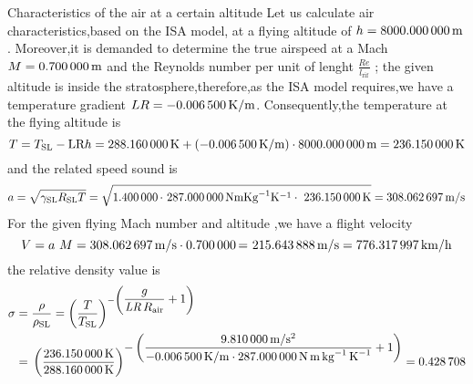 \documentclass[[12pt,twoside]{book}
\begin{document}
%

%
\begin{myExampleX}{Characteristics of the air at a certain altitude}{}%
\label{example:Characteristics:Of:The:Air:At:A:Certain:Altitude}
%
\noindent
Let us calculate air characteristics,based on the ISA model, at a flying altitude of $h=\SI[round-precision=0]{\myAltitudeM}{m}$.
% 
Moreover,it is demanded to determine the true airspeed at a Mach $M=\SI[round-precision=2]{\myMachnumber}{m}$ and the Reynolds number per unit of lenght $\frac{ Re }{l_\text{rif} }$ ; the given altitude is inside the stratosphere,therefore,as the ISA model requires,we have a temperature gradient $LR=\SI[round-precision=4]{\myTemperaturegradient}{K/m}$.
Consequently,the temperature at the flying altitude is
\[
 T = {T_\text{SL}- \text{LR} h   =\SI[round-precision=2]{\myTemperaturesealevelK}{K}+(\SI[round-precision=4]{\myTemperaturegradient}{K/m}) \cdot\SI[round-precision=0]{\myAltitudeM}{m} } = \SI[round-precision=1]{\myTemperatureK}{K}
 \]
and the related speed sound  is
\[
a={\sqrt{\gamma_\text{SL}{R_\text{SL}}{T}}}=\sqrt{\SI[round-precision=1]{\myAdiabaticindex}\cdot\ \SI[round-precision=0]{\myAirspecificconstant} {N m Kg^{-1} K^{-1} } \cdot\ \SI[round-precision=2]{\myTemperatureK} {K}} = \SI[round-precision=2]{\mySoundspeed} {m/s}
\]
\noindent
%
For the given flying Mach number and altitude ,we have a flight velocity
\[
 V = {a }~{M} =\SI[round-precision=2]{\mySoundspeed}{m/s} \cdot \SI[round-precision=2]{\myMachnumber}= ~\SI[round-precision=2]{\mySpeedMs}{m/s} = \SI[round-precision=2]{\mySpeedkmh}{km/h} 
 \]
the relative density value is 
\[
\begin{split}
\sigma 
    & ={} \frac{\rho}{\rho_\text{SL}} = 
    \left( \frac{T}{T_\text{SL} } \right)^{
        -\left(\displaystyle \dfrac{ g }{\textit{LR}\, R_\text{air}} + 1 \right)
        } 
    \\ 
    & ={} \left(\frac{
        \SI[round-precision=2]{\myTemperatureK}{K} 
        }{
        \SI[round-precision=2]{\myTemperaturesealevelK}{K}
        }\right)^{\displaystyle
            -\left( \dfrac{
                \SI[round-precision=2]{\myGravitationalacceleration}{m/s^2}
                }{
                \SI[round-precision=4]{\myTemperaturegradient}{K/m}
                \cdot
                \SI[round-precision=0]{\myAirspecificconstant}{N\,m\,kg^{-1}\,K^{-1}}
                }{}
            + 1 \right)
        }
        = \SI[round-precision=3]{\myRelativedensity}{}
\end{split}
\]


\end{myExampleX}
\end{document}
